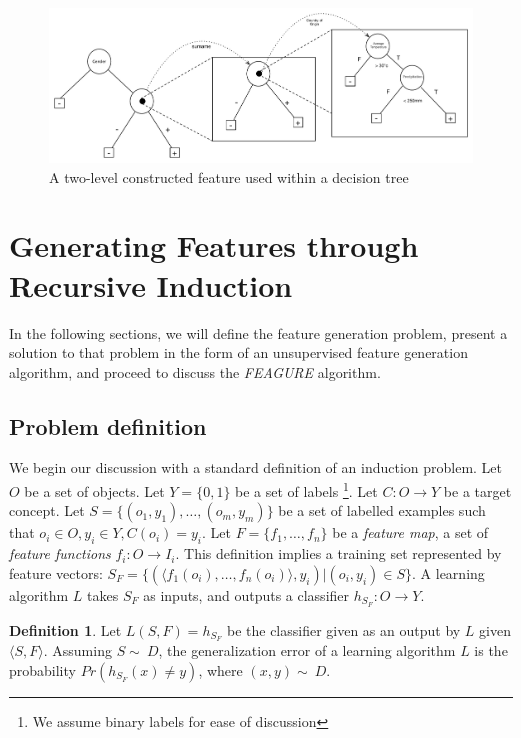 \documentclass[twoside,11pt]{article}
\theoremstyle{definition}
\newtheorem{defn}{Definition}[section]
\begin{document}
\begin{figure}[t]
	\centering
	\includegraphics[width=\linewidth]{fig3.pdf}
	\caption{A two-level constructed feature used within a decision tree}
	\label{fig:lvl2_tree}
\end{figure}

\section{Generating Features through Recursive Induction} \label{formal}

In the following sections, we will define the feature generation problem, present a solution to that problem in the form of an unsupervised feature generation algorithm, and proceed to discuss the \emph{FEAGURE} algorithm. %

\subsection{Problem definition}

We begin our discussion with a standard definition of an induction problem. 
Let $O$ be a set of objects. Let $Y=\{0,1\}$ be a set of labels \footnote{We assume binary labels for ease of discussion}. Let $C:O\rightarrow Y$ be a target concept. Let $S=\{(o_{1},y_{1}),\ldots,(o_{m},y_{m})\}$ be a set of labelled examples such that $o_{i}\in O, y_{i}\in Y, C(o_i)=y_i$. 
Let $F=\{f_{1},\ldots,f_{n}\}$ be a \emph{feature map}, a set of \emph{feature functions} $f_{i}:O\rightarrow I_{i}$.  This definition implies a training set represented by feature vectors: $S_F=\{ (\langle f_1(o_i),\ldots,f_n(o_i)\rangle, y_i) | (o_i,y_i) \in S\}$. A learning algorithm $L$ takes $S_F$ as inputs, and outputs a classifier $h_{S_F}:O\rightarrow Y$.
\begin{defn}
	Let $L(S,F)=h_{S_F}$ be the classifier given as an output by $L$ given $\langle S,F\rangle$. Assuming $S\sim\ D$, the generalization error of a learning algorithm $L$ is the probability $Pr(h_{S_F}(x)\neq y)$, where $(x,y)\sim\ D$.
\end{defn}
\end{document}
